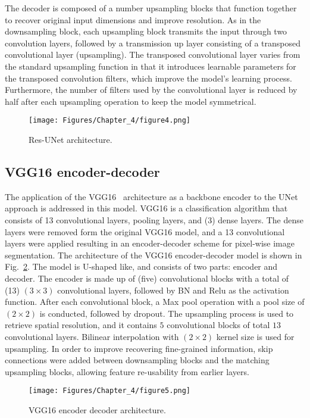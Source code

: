 The decoder is composed of a number upsampling blocks that function together to recover original input dimensions and improve resolution.
As in the downsampling block, each upsampling block transmits the input through two convolution layers, followed by a transmission up layer consisting of a transposed convolutional layer (upsampling).
The transposed convolutional layer varies from the standard upsampling function in that it introduces learnable parameters for the transposed convolution filters, which improve the model's learning process.
Furthermore, the number of filters used by the convolutional layer is reduced by half after each upsampling operation to keep the model symmetrical.
\begin{figure} [h!]
	\begin{center}
		\texttt{[image: Figures/Chapter\_4/figure4.png]}
	\end{center}
	\caption{Res-UNet architecture.} 
	\label{fig:Unet}
\end{figure}
\subsection{VGG16 encoder-decoder}
\label{sec433}
The application of the VGG16~\cite{Simonyan2015} architecture as a backbone encoder to the UNet~\cite{Ronneberger2015} approach is addressed in this model.
VGG16 is a classification algorithm that consists of 13 convolutional layers, pooling layers, and (3) dense layers.
The dense layers were removed form the original VGG16 model, and a 13 convolutional layers were applied resulting in an encoder-decoder scheme for pixel-wise image segmentation.
The architecture of the VGG16 encoder-decoder model is shown in Fig.~\ref{vgg16}.
The model is U-shaped like, and consists of two parts: encoder and decoder.
The encoder is made up of (five) convolutional blocks with a total of (13) \((3\times3)\) convolutional layers, followed by BN and Relu as the activation function.
After each convolutional block, a Max pool operation with a pool size of \((2\times2)\) is conducted, followed by dropout. 
The upsampling process is used to retrieve spatial resolution, and it contains \(5\) convolutional blocks of total \(13\) convolutional layers.
Bilinear interpolation with \((2\times2)\) kernel size is used for upsampling.
In order to improve recovering fine-grained information, skip connections were added between downsampling blocks and the matching upsampling blocks, allowing feature re-usability from earlier layers.
\begin{figure} [h!]
	\begin{center}
		\texttt{[image: Figures/Chapter\_4/figure5.png]}
	\end{center}
	\caption{VGG16 encoder decoder architecture.} 
	\label{vgg16}
\end{figure}

